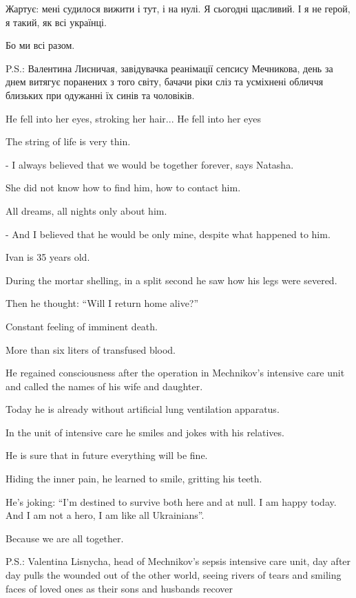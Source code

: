 Жартує: мені судилося вижити і тут, і на нулі. Я сьогодні щасливий. І я не
герой, я такий, як всі українці. 

Бо ми всі разом.

P.S.: Валентина Лисничая, завідувачка реанімації сепсису Мечникова, день за
днем витягує поранених з того світу, бачачи ріки сліз та усміхнені обличчя
близьких при одужанні їх синів та чоловіків.

He fell into her eyes, stroking her hair... He fell into her eyes

The string of life is very thin.

- I always believed that we would be together forever, says Natasha.

She did not know how to find him, how to contact him.

All dreams, all nights only about him.

- And I believed that he would be only mine, despite what happened to him.

Ivan is 35 years old.

During the mortar shelling, in a split second he saw how his legs were severed. 

Then he thought: \enquote{Will I return home alive?}

Constant feeling of imminent death. 

More than six liters of transfused blood.

He regained consciousness after the operation in Mechnikov’s intensive care
unit and called the names of his wife and daughter.

Today he is already without artificial lung ventilation apparatus.

In the unit of intensive care he smiles and jokes with his relatives.

He is sure that in future everything will be fine. 

Hiding the inner pain, he learned to smile, gritting his teeth.

He's joking: \enquote{I'm destined to survive both here and at null. I am happy today.
And I am not a hero, I am like all Ukrainians}.

Because we are all together.

P.S.: Valentina Lisnycha, head of Mechnikov’s sepsis intensive care unit, day
after day pulls the wounded out of the other world, seeing rivers of tears and
smiling faces of loved ones as their sons and husbands recover
